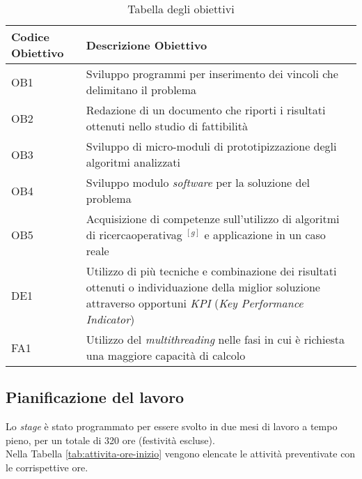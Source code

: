 \begin{center}
    \begin{longtable}{m{3cm}m{9cm}}
    \caption{Tabella degli obiettivi}
    \label{tab:obiettivi}
    \\ \hline
    \centering \textbf{Codice Obiettivo} & \centering \textbf{Descrizione Obiettivo} \arraybackslash \\
    \hline
    \centering OB1 & Sviluppo programmi per inserimento
    dei vincoli che delimitano il problema \arraybackslash \\
    \hline
    \centering OB2 & Redazione di un documento che riporti
    i risultati ottenuti nello studio di fattibilità \arraybackslash \\
    \hline
    \centering OB3 & Sviluppo di micro-moduli di prototipizzazione degli algoritmi analizzati \arraybackslash \\
    \hline
    \centering OB4 & Sviluppo modulo \textit{software} per
    la soluzione del problema \arraybackslash \\
    \hline
    \centering OB5 & Acquisizione di competenze sull’utilizzo
    di algoritmi di \gls{ricercaoperativag} $^{[g]}$ e
    applicazione in un caso reale \arraybackslash \\
    \hline
    \centering DE1 & Utilizzo di più tecniche e combinazione dei risultati
    ottenuti o individuazione della miglior soluzione attraverso
    opportuni \textit{KPI} (\textit{Key Performance Indicator}) \arraybackslash \\
    \hline
    \centering FA1 & Utilizzo del \textit{multithreading}
    nelle fasi in cui è richiesta una
    maggiore capacità di calcolo \arraybackslash \\
    \hline
    \end{longtable}
\end{center}%

\subsection{Pianificazione del lavoro}
\label{sec:pianificazione-lavoro}
\noindent Lo \textit{stage} è stato programmato per essere svolto in due mesi di lavoro
a tempo pieno, per un totale di 320 ore (festività escluse).\\
\noindent Nella Tabella \ref{tab:attivita-ore-inizio} vengono elencate
le attività preventivate con le corrispettive ore.

\renewcommand{\arraystretch}{1.55}

